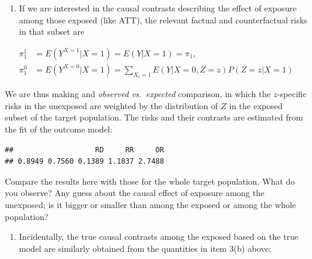 \documentclass[
]{book}
\newenvironment{Shaded}{\begin{snugshade}}{\end{snugshade}}
\newcommand{\DecValTok}[1]{\textcolor[rgb]{0.00,0.00,0.81}{#1}}
\newcommand{\FunctionTok}[1]{\textcolor[rgb]{0.13,0.29,0.53}{\textbf{#1}}}
\newcommand{\NormalTok}[1]{#1}
\newcommand{\OtherTok}[1]{\textcolor[rgb]{0.56,0.35,0.01}{#1}}
\newcommand{\SpecialCharTok}[1]{\textcolor[rgb]{0.81,0.36,0.00}{\textbf{#1}}}
\providecommand{\tightlist}{%
  \setlength{\itemsep}{0pt}\setlength{\parskip}{0pt}}
\begin{document}
\begin{enumerate}
\def\labelenumi{\arabic{enumi}.}
\setcounter{enumi}{4}
\tightlist
\item
  If we are interested in the causal contrasts describing the
  effect of exposure among those exposed
  (like ATT), the relevant factual and counterfactual risks
  in that subset are
\end{enumerate}

\[
\begin{aligned}
 \pi^1_1 & = E(Y^{X=1}|X=1) = E(Y|X=1) = \pi_1, \\
 \pi^0_1 & = E(Y^{X=0}|X=1) = \sum_{X_i=1} E(Y|X=0, Z=z)P(Z=z|X=1)
\end{aligned}
\]

We are thus making and \emph{observed vs.~expected} comparison, in which
the \(z\)-specific risks in the unexposed are weighted by
the distribution of \(Z\) in the exposed subset of the target population.
The risks and their contrasts are estimated from the fit
of the outcome model:

\begin{Shaded}
\end{Shaded}

\begin{verbatim}
##                   RD     RR     OR 
## 0.8949 0.7560 0.1389 1.1837 2.7488
\end{verbatim}

Compare the results here with those for the whole
target population. What do you observe?
Any guess about the causal effect of exposure
among the unexposed; is it bigger or smaller than
among the exposed or among the whole population?

\begin{enumerate}
\def\labelenumi{\arabic{enumi}.}
\tightlist
\item
  Incidentally, the true causal contrasts among the exposed
  based on the true model are similarly obtained from the quantities
  in item 3(b) above:
\end{enumerate}
\end{document}
